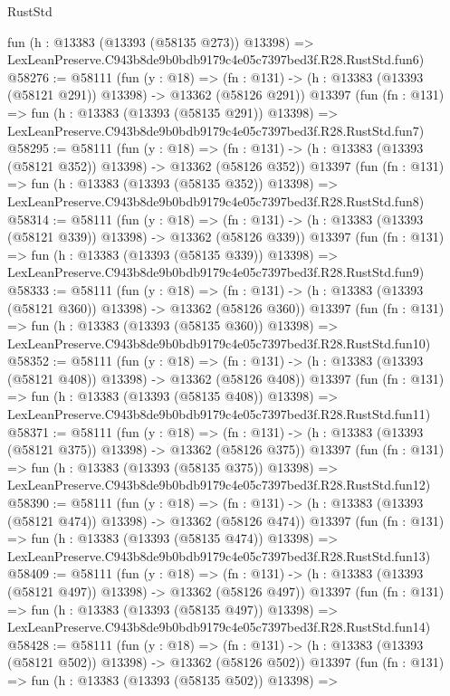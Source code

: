 \begin{lexlean}{RustStd}
\begin{coremodule}
    fun (h : @13383 (@13393 (@58135 @273)) @13398) =>
    LexLeanPreserve.C943b8de9b0bdb9179c4e05c7397bed3f.R28.RustStd.fun6)
@58276 := @58111
    (fun (y : @18) =>
    (fn : @131) -> (h : @13383 (@13393 (@58121 @291)) @13398) -> @13362 (@58126 @291))
    @13397
    (fun (fn : @131) =>
    fun (h : @13383 (@13393 (@58135 @291)) @13398) =>
    LexLeanPreserve.C943b8de9b0bdb9179c4e05c7397bed3f.R28.RustStd.fun7)
@58295 := @58111
    (fun (y : @18) =>
    (fn : @131) -> (h : @13383 (@13393 (@58121 @352)) @13398) -> @13362 (@58126 @352))
    @13397
    (fun (fn : @131) =>
    fun (h : @13383 (@13393 (@58135 @352)) @13398) =>
    LexLeanPreserve.C943b8de9b0bdb9179c4e05c7397bed3f.R28.RustStd.fun8)
@58314 := @58111
    (fun (y : @18) =>
    (fn : @131) -> (h : @13383 (@13393 (@58121 @339)) @13398) -> @13362 (@58126 @339))
    @13397
    (fun (fn : @131) =>
    fun (h : @13383 (@13393 (@58135 @339)) @13398) =>
    LexLeanPreserve.C943b8de9b0bdb9179c4e05c7397bed3f.R28.RustStd.fun9)
@58333 := @58111
    (fun (y : @18) =>
    (fn : @131) -> (h : @13383 (@13393 (@58121 @360)) @13398) -> @13362 (@58126 @360))
    @13397
    (fun (fn : @131) =>
    fun (h : @13383 (@13393 (@58135 @360)) @13398) =>
    LexLeanPreserve.C943b8de9b0bdb9179c4e05c7397bed3f.R28.RustStd.fun10)
@58352 := @58111
    (fun (y : @18) =>
    (fn : @131) -> (h : @13383 (@13393 (@58121 @408)) @13398) -> @13362 (@58126 @408))
    @13397
    (fun (fn : @131) =>
    fun (h : @13383 (@13393 (@58135 @408)) @13398) =>
    LexLeanPreserve.C943b8de9b0bdb9179c4e05c7397bed3f.R28.RustStd.fun11)
@58371 := @58111
    (fun (y : @18) =>
    (fn : @131) -> (h : @13383 (@13393 (@58121 @375)) @13398) -> @13362 (@58126 @375))
    @13397
    (fun (fn : @131) =>
    fun (h : @13383 (@13393 (@58135 @375)) @13398) =>
    LexLeanPreserve.C943b8de9b0bdb9179c4e05c7397bed3f.R28.RustStd.fun12)
@58390 := @58111
    (fun (y : @18) =>
    (fn : @131) -> (h : @13383 (@13393 (@58121 @474)) @13398) -> @13362 (@58126 @474))
    @13397
    (fun (fn : @131) =>
    fun (h : @13383 (@13393 (@58135 @474)) @13398) =>
    LexLeanPreserve.C943b8de9b0bdb9179c4e05c7397bed3f.R28.RustStd.fun13)
@58409 := @58111
    (fun (y : @18) =>
    (fn : @131) -> (h : @13383 (@13393 (@58121 @497)) @13398) -> @13362 (@58126 @497))
    @13397
    (fun (fn : @131) =>
    fun (h : @13383 (@13393 (@58135 @497)) @13398) =>
    LexLeanPreserve.C943b8de9b0bdb9179c4e05c7397bed3f.R28.RustStd.fun14)
@58428 := @58111
    (fun (y : @18) =>
    (fn : @131) -> (h : @13383 (@13393 (@58121 @502)) @13398) -> @13362 (@58126 @502))
    @13397
    (fun (fn : @131) =>
    fun (h : @13383 (@13393 (@58135 @502)) @13398) =>

\end{coremodule}
\end{lexlean}
